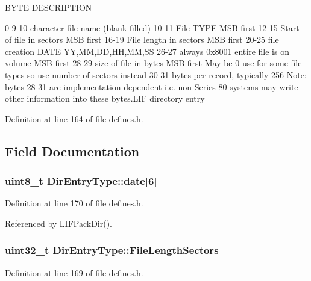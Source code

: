 B\+Y\+TE D\+E\+S\+C\+R\+I\+P\+T\+I\+ON 

 0-\/9 10-\/character file name (blank filled) 10-\/11 File T\+Y\+PE M\+SB first 12-\/15 Start of file in sectors M\+SB first 16-\/19 File length in sectors M\+SB first 20-\/25 file creation D\+A\+TE YY,MM,DD,HH,MM,SS 26-\/27 always 0x8001 entire file is on volume M\+SB first 28-\/29 size of file in bytes M\+SB first May be 0 use for some file types so use number of sectors instead 30-\/31 bytes per record, typically 256 Note\+: bytes 28-\/31 are implementation dependent i.\+e. non-\/\+Series-\/80 systems may write other information into these bytes.\+L\+IF directory entry 

Definition at line 164 of file defines.\+h.



\subsection{Field Documentation}
\subsubsection[{\texorpdfstring{date}{date}}]{\setlength{\rightskip}{0pt plus 5cm}uint8\+\_\+t Dir\+Entry\+Type\+::date\mbox{[}6\mbox{]}}\hypertarget{structDirEntryType_a1850264d3e4eac53b665a702ac7000fd}{}\label{structDirEntryType_a1850264d3e4eac53b665a702ac7000fd}


Definition at line 170 of file defines.\+h.



Referenced by L\+I\+F\+Pack\+Dir().

\subsubsection[{\texorpdfstring{File\+Length\+Sectors}{FileLengthSectors}}]{\setlength{\rightskip}{0pt plus 5cm}uint32\+\_\+t Dir\+Entry\+Type\+::\+File\+Length\+Sectors}\hypertarget{structDirEntryType_a0ad3a6b6da198caa68e7e82d025975cb}{}\label{structDirEntryType_a0ad3a6b6da198caa68e7e82d025975cb}


Definition at line 169 of file defines.\+h.



